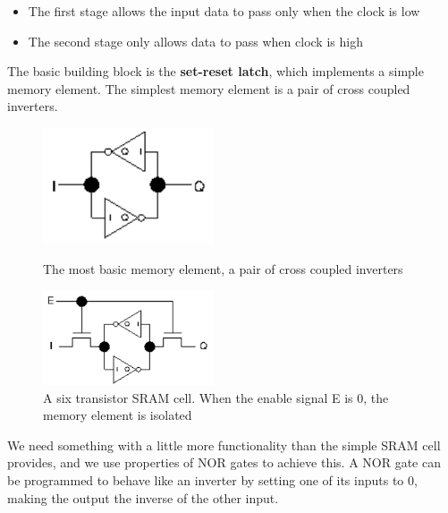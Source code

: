 \documentclass{article}
\begin{document}
	\begin{itemize}
		\item The first stage allows the input data to pass only when the clock is low
		\item The second stage only allows data to pass when clock is high
	\end{itemize}	
	
	The basic building block is the \textbf{set-reset latch}, which implements a simple memory element. The simplest memory element is a pair of cross coupled inverters.

	\begin{figure}
		\begin{minipage}[t]{0.45\textwidth}
		\centering
		\includegraphics[width=0.45\textwidth]{cross_coupled_inverters}
		\caption{The most basic memory element, a pair of cross coupled inverters}
		\label{cross coupled inverters}		
		\end{minipage}
		\hfill
		\begin{minipage}[t]{0.45\textwidth}
		\centering
		\includegraphics[width=0.45\textwidth]{sram_cell}
		\caption{A six transistor SRAM cell. When the enable signal E is 0, the memory element is isolated}
		\label{fig:sram cell}
		\end{minipage}
	\end{figure}
	
	We need something with a little more functionality than the simple SRAM cell provides, and we use properties of NOR gates to achieve this. A NOR gate can be programmed to behave like an inverter by setting one of its inputs to 0, making the output the inverse of the other input. 
	
\end{document}
